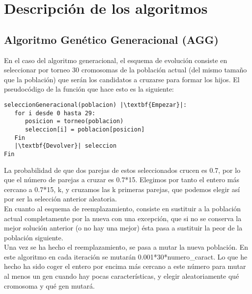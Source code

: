 \documentclass[12pt]{article}
\begin{document}
\newpage

\section{Descripción de los algoritmos}

\subsection{Algoritmo Genético Generacional (AGG)}
En el caso del algoritmo generacional, el esquema de evolución consiste en seleccionar por torneo 30 cromosomas de la población actual (del mismo tamaño que la población) que serán los candidatos a cruzarse para formar los hijos. El pseudocódigo de la función que hace esto es la siguiente:
\begin{lstlisting}
seleccionGeneracional(poblacion) |\textbf{Empezar}|:
   for i desde 0 hasta 29:
      posicion = torneo(poblacion)
      seleccion[i] = poblacion[posicion]
   Fin
   |\textbf{Devolver}| seleccion
Fin
\end{lstlisting}

La probabilidad de que dos parejas de estos seleccionados crucen es 0.7, por lo que el número de parejas a cruzar es 0.7*15. Elegimos por tanto el entero más cercano a 0.7*15, k, y cruzamos las k primeras parejas, que podemos elegir así por ser la selección anterior aleatoria.\\

En cuanto al esquema de reemplazamiento, consiste en sustituir a la población actual completamente por la nueva con una excepción, que si no se conserva la mejor solución anterior (o no hay una mejor) ésta pasa a sustituir la peor de la población siguiente.\\
Una vez se ha hecho el reemplazamiento, se pasa a mutar la nueva población. En este algoritmo en cada iteración se mutarán 0.001*30*numero\_caract. Lo que he hecho ha sido coger el entero por encima más cercano a este número para mutar al menos un gen cuando hay pocas características, y elegir aleatoriamente qué cromosoma y qué gen mutará.\\
\end{document}
